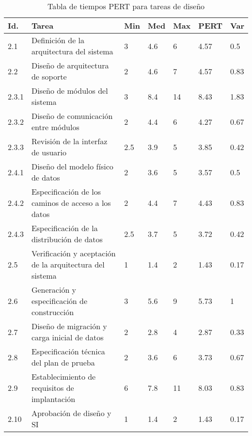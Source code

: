 \documentclass[11pt,a4paper,spanish,twoside]{report}
\begin{document}
\begin{table}[!h]
\centering
  \begin{tabular}{|p{0.8cm}||p{4cm}||p{0.75cm}|p{0.75cm}|p{0.75cm}|p{1.10cm}|
p{0.75cm}|}
    \hline
    \textbf{Id.} & \textbf{Tarea} & \textbf{Min} &
    \textbf{Med} & \textbf{Max} & \textbf{PERT} & \textbf{Var}\\
    \hline
    2.1 & Definición de la arquitectura del sistema & 3 & 4.6 & 6 & 4.57 & 0.5\\
    \hline
    2.2 & Diseño de arquitectura de soporte & 2 & 4.6 & 7 & 4.57 & 0.83\\
    \hline
    2.3.1 & Diseño de módulos del sistema & 3 & 8.4 & 14 & 8.43 & 1.83\\
    \hline
    2.3.2 & Diseño de comunicación entre módulos & 2 & 4.4 & 6 & 4.27 & 0.67\\
    \hline
    2.3.3 & Revisión de la interfaz de usuario &2.5 & 3.9 & 5 & 3.85 & 0.42\\
    \hline
    2.4.1 & Diseño del modelo físico de datos & 2 & 3.6 & 5 & 3.57 & 0.5\\
    \hline
    2.4.2 & Especificación de los caminos de acceso a los datos & 2 & 4.4 &
    7 & 4.43 & 0.83\\
    \hline
    2.4.3 & Especificación de la distribución de datos & 2.5 & 3.7 & 5 & 3.72
    & 0.42\\
    \hline
    2.5 & Verificación y aceptación de la arquitectura del sistema & 1 & 1.4
    & 2 & 1.43 & 0.17\\
    \hline
    2.6 & Generación y especificación de construcción & 3 & 5.6 & 9 & 5.73 & 1\\
    \hline
    2.7 & Diseño de migración y carga inicial de datos & 2 & 2.8 & 4 & 2.87 &
    0.33\\
    \hline
    2.8 & Especificación técnica del plan de prueba & 2 & 3.6 & 6 & 3.73 &
    0.67 \\
    \hline
    2.9 & Establecimiento de requisitos de implantación & 6 & 7.8 & 11 & 8.03
    & 0.83\\
    \hline
    2.10 & Aprobación de diseño y SI & 1 & 1.4 & 2 & 1.43 & 0.17\\
    \hline
  \end{tabular}
  \caption{Tabla de tiempos PERT para tareas de diseño} \label{Tab:tareas2}
\end{table}
\end{document}
